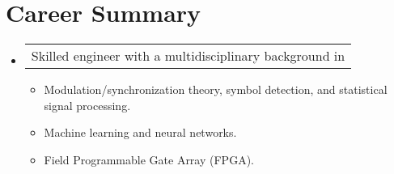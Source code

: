 \section{Career Summary}

\begin{itemize}[leftmargin=0.15in, label={}] %
    \item   \begin{tabular*}{0.2\textwidth}{l} Skilled engineer with a multidisciplinary background in \end{tabular*}\vspace{-7pt} %
            \begin{itemize} %
                \item{Modulation/synchronization theory, symbol detection, and statistical  signal processing. \vspace{-2pt}} %
                \item{Machine learning and neural networks. \vspace{-2pt}} %
                \item{Field Programmable Gate Array (FPGA). \vspace{-2pt}} %
            \end{itemize}\vspace{-5pt}
\end{itemize} %